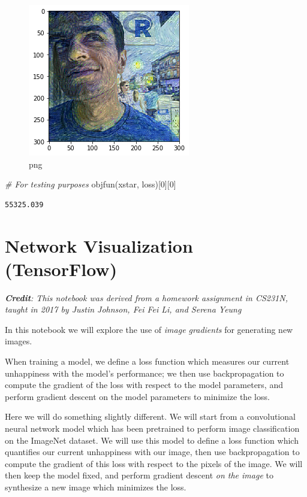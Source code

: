 \documentclass[]{book}
\newenvironment{Shaded}{\begin{snugshade}}{\end{snugshade}}
\newcommand{\DecValTok}[1]{\textcolor[rgb]{0.00,0.00,0.81}{#1}}
\newcommand{\CommentTok}[1]{\textcolor[rgb]{0.56,0.35,0.01}{\textit{#1}}}
\newcommand{\NormalTok}[1]{#1}
\theoremstyle{definition}
\theoremstyle{definition}
\theoremstyle{definition}
\theoremstyle{remark}
\begin{document}
\begin{figure}
\centering
\includegraphics{output_11_2.png}
\caption{png}
\end{figure}

\begin{Shaded}
\begin{Highlighting}[]
\CommentTok{# For testing purposes}
\NormalTok{objfun(xstar, loss)[}\DecValTok{0}\NormalTok{][}\DecValTok{0}\NormalTok{]}
\end{Highlighting}
\end{Shaded}

\begin{verbatim}
55325.039
\end{verbatim}

\chapter{Network Visualization
(TensorFlow)}\label{network-visualization-tensorflow}

\emph{\textbf{Credit}: This notebook was derived from a homework
assignment in CS231N, taught in 2017 by Justin Johnson, Fei Fei Li, and
Serena Yeung}

In this notebook we will explore the use of \emph{image gradients} for
generating new images.

When training a model, we define a loss function which measures our
current unhappiness with the model's performance; we then use
backpropagation to compute the gradient of the loss with respect to the
model parameters, and perform gradient descent on the model parameters
to minimize the loss.

Here we will do something slightly different. We will start from a
convolutional neural network model which has been pretrained to perform
image classification on the ImageNet dataset. We will use this model to
define a loss function which quantifies our current unhappiness with our
image, then use backpropagation to compute the gradient of this loss
with respect to the pixels of the image. We will then keep the model
fixed, and perform gradient descent \emph{on the image} to synthesize a
new image which minimizes the loss.
\end{document}
